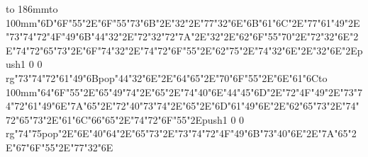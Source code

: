 \hbox to 186mm{\hsize=81mm\vbox to 100mm{\vfill\ipa\char"6D\ipa\char"6F\ipa\char"55\ipa\char"2E\ipa\char"6F\ipa\char"55\ipa\char"73\ipa\char"6B\ipa\char"2E\ipa\char"32\ipa\char"2E\ipa\char"77\ipa\char"32\ipa\char"6E\medskip\ipa\char"6B\ipa\char"61\ipa\char"6C\ipa\char"2E\ipa\char"77\ipa\char"61\ipa\char"49\ipa\char"2E\ipa\char"73\ipa\char"74\ipa\char"72\ipa\char"4F\ipa\char"49\ipa\char"6B\medskip\ipa\char"44\ipa\char"32\ipa\char"2E\ipa\char"72\ipa\char"32\ipa\char"72\ipa\char"7A\ipa\char"2E\ipa\char"32\ipa\char"2E\ipa\char"62\ipa\char"6F\ipa\char"55\ipa\char"70\ipa\char"2E\ipa\char"72\ipa\char"32\ipa\char"6E\ipa\char"2E\ipa\char"74\ipa\char"72\ipa\char"65\ipa\char"73\ipa\char"2E\ipa\char"6F\ipa\char"74\medskip\ipa\char"32\ipa\char"2E\ipa\char"74\ipa\char"72\ipa\char"6F\ipa\char"55\ipa\char"2E\ipa\char"62\ipa\char"75\ipa\char"2E\ipa\char"74\ipa\char"32\ipa\char"6E\ipa\char"2E\ipa\char"32\ipa\char"6E\ipa\char"2E\pdfcolorstack\match push{1 0 0 rg}\ipa\char"73\ipa\char"74\ipa\char"72\ipa\char"61\ipa\char"49\ipa\char"6B\pdfcolorstack\match pop{}\medskip\ipa\char"44\ipa\char"32\ipa\char"6E\ipa\char"2E\ipa\char"64\ipa\char"65\ipa\char"2E\ipa\char"70\ipa\char"6F\ipa\char"55\ipa\char"2E\ipa\char"6E\ipa\char"61\ipa\char"6C\vfill}\hfill\vbox to 100mm{\vfill\ipa\char"64\ipa\char"6F\ipa\char"55\ipa\char"2E\ipa\char"65\ipa\char"49\ipa\char"74\ipa\char"2E\ipa\char"65\ipa\char"2E\ipa\char"74\ipa\char"40\ipa\char"6E\medskip\ipa\char"44\ipa\char"45\ipa\char"6D\ipa\char"2E\ipa\char"72\ipa\char"4F\ipa\char"49\ipa\char"2E\ipa\char"73\ipa\char"74\ipa\char"72\ipa\char"61\ipa\char"49\ipa\char"6E\medskip\ipa\char"7A\ipa\char"65\ipa\char"2E\ipa\char"72\ipa\char"40\ipa\char"73\ipa\char"74\ipa\char"2E\ipa\char"65\ipa\char"2E\ipa\char"6D\ipa\char"61\ipa\char"49\ipa\char"6E\ipa\char"2E\ipa\char"62\ipa\char"65\ipa\char"73\ipa\char"2E\ipa\char"74\ipa\char"72\ipa\char"65\ipa\char"73\ipa\char"2E\ipa\char"61\ipa\char"6C\ipa\char"66\medskip\ipa\char"65\ipa\char"2E\ipa\char"74\ipa\char"72\ipa\char"6F\ipa\char"55\ipa\char"2E\pdfcolorstack\match push{1 0 0 rg}\ipa\char"74\ipa\char"75\pdfcolorstack\match pop{}\ipa\char"2E\ipa\char"6E\ipa\char"40\ipa\char"64\ipa\char"2E\ipa\char"65\ipa\char"73\ipa\char"2E\ipa\char"73\ipa\char"74\ipa\char"72\ipa\char"4F\ipa\char"49\ipa\char"6B\medskip\ipa\char"73\ipa\char"40\ipa\char"6E\ipa\char"2E\ipa\char"7A\ipa\char"65\ipa\char"2E\ipa\char"67\ipa\char"6F\ipa\char"55\ipa\char"2E\ipa\char"77\ipa\char"32\ipa\char"6E\vfill}}\eject
